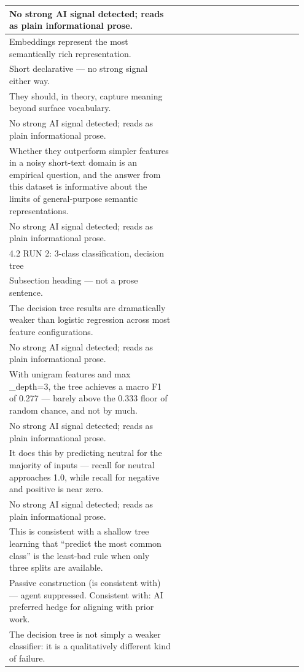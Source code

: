 \documentclass[11pt]{article}
\begin{document}
\begin{longtable}{|p{0.55\linewidth}|p{0.40\linewidth}|}
\hline
No strong AI signal detected; reads as plain informational prose. & \\
\hline
Embeddings represent the most semantically rich representation. & \\[2pt]
\hline
Short declarative --- no strong signal either way. & \\
\hline
They should, in theory, capture meaning beyond surface vocabulary. & \\[2pt]
\hline
No strong AI signal detected; reads as plain informational prose. & \\
\hline
Whether they outperform simpler features in a noisy short-text domain is an empirical question, and the answer from this dataset is informative about the limits of general-purpose semantic representations. & \\[2pt]
\hline
No strong AI signal detected; reads as plain informational prose. & \\
\hline
4.2 RUN 2: 3-class classification, decision tree & \\[2pt]
\hline
Subsection heading --- not a prose sentence. & \\
\hline
The decision tree results are dramatically weaker than logistic regression across most feature configurations. & \\[2pt]
\hline
No strong AI signal detected; reads as plain informational prose. & \\
\hline
With unigram features and max \_depth=3, the tree achieves a macro F1 of 0.277 --- barely above the 0.333 floor of random chance, and not by much. & \\[2pt]
\hline
No strong AI signal detected; reads as plain informational prose. & \\
\hline
It does this by predicting neutral for the majority of inputs --- recall for neutral approaches 1.0, while recall for negative and positive is near zero. & \\[2pt]
\hline
No strong AI signal detected; reads as plain informational prose. & \\
\hline
This is consistent with a shallow tree learning that ``predict the most common class'' is the least-bad rule when only three splits are available. & \\[2pt]
\hline
Passive construction (is consistent with) --- agent suppressed. Consistent with: AI preferred hedge for aligning with prior work. & \\
\hline
The decision tree is not simply a weaker classifier: it is a qualitatively different kind of failure. & \\[2pt]

\end{longtable}
\end{document}
